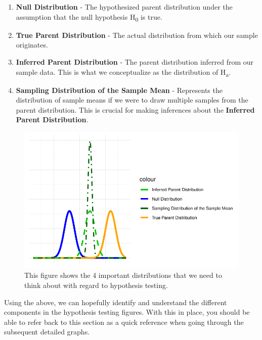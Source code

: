 \documentclass[
  letterpaper,
  DIV=11,
  numbers=noendperiod]{scrartcl}
\begin{document}
\begin{enumerate}
\def\labelenumi{\arabic{enumi}.}
\item
  \textbf{Null Distribution} - The hypothesized parent distribution
  under the assumption that the null hypothesis H\textsubscript{0} is
  true.
\item
  \textbf{True Parent Distribution} - The actual distribution from which
  our sample originates.
\item
  \textbf{Inferred Parent Distribution} - The parent distribution
  inferred from our sample data. This is what we conceptualize as the
  distribution of H\textsubscript{a}.
\item
  \textbf{Sampling Distribution of the Sample Mean} - Represents the
  distribution of sample means if we were to draw multiple samples from
  the parent distribution. This is crucial for making inferences about
  the \textbf{Inferred Parent Distribution}.
\end{enumerate}

\begin{figure}

{\centering \includegraphics[width=1\textwidth,height=\textheight]{Supplemental_Chapter---Hypothesis-Testing_files/figure-pdf/fig-5-5.keyfig-1.pdf}

}

\caption{\label{fig-5-5.keyfig}This figure shows the 4 important
distributions that we need to think about with regard to hypothesis
testing.}

\end{figure}

Using the above, we can hopefully identify and understand the different
components in the hypothesis testing figures. With this in place, you
should be able to refer back to this section as a quick reference when
going through the subsequent detailed graphs.
\end{document}
